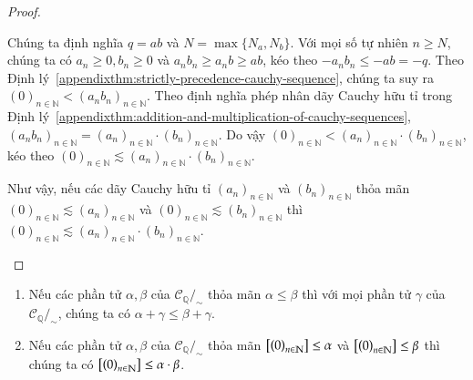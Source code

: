 \begin{proof}
\begin{enumerate}[label={(\roman*)}]
\begin{enumerate}[label={\textbf{Trường hợp \arabic*.}},itemindent=1cm]
                        Chúng ta định nghĩa $q = ab$ và $N = \max\{ N_{a}, N_{b} \}$. Với mọi số tự nhiên $n\geq N$, chúng ta có $a_{n}\geq 0, b_{n}\geq 0$ và $a_{n}b_{n}\geq a_{n}b \geq ab$, kéo theo $-a_{n}b_{n}\leq -ab = -q$. Theo Định lý~\ref{appendixthm:strictly-precedence-cauchy-sequence}, chúng ta suy ra ${(0)}_{n\in\mathbb{N}} < {(a_{n}b_{n})}_{n\in\mathbb{N}}$. Theo định nghĩa phép nhân dãy Cauchy hữu tỉ trong Định lý~\ref{appendixthm:addition-and-multiplication-of-cauchy-sequences}, ${(a_{n}b_{n})}_{n\in\mathbb{N}} = {(a_{n})}_{n\in\mathbb{N}}\cdot {(b_{n})}_{n\in\mathbb{N}}$. Do vậy ${(0)}_{n\in\mathbb{N}} < {(a_{n})}_{n\in\mathbb{N}}\cdot {(b_{n})}_{n\in\mathbb{N}}$, kéo theo ${(0)}_{n\in\mathbb{N}} \lesssim {(a_{n})}_{n\in\mathbb{N}}\cdot {(b_{n})}_{n\in\mathbb{N}}$.
              \end{enumerate}

              Như vậy, nếu các dãy Cauchy hữu tỉ ${(a_{n})}_{n\in\mathbb{N}}$ và ${(b_{n})}_{n\in\mathbb{N}}$ thỏa mãn ${(0)}_{n\in\mathbb{N}}\lesssim {(a_{n})}_{n\in\mathbb{N}}$ và ${(0)}_{n\in\mathbb{N}}\lesssim {(b_{n})}_{n\in\mathbb{N}}$ thì ${(0)}_{n\in\mathbb{N}}\lesssim {(a_{n})}_{n\in\mathbb{N}}\cdot {(b_{n})}_{n\in\mathbb{N}}$.
    \end{enumerate}
\end{proof}

\begin{appendixthm}
    \begin{enumerate}[label={(\roman*)}]
        \item Nếu các phần tử $\alpha, \beta$ của $\mathscr{C}_{\mathbb{Q}}/_{\sim}$ thỏa mãn $\alpha\leq \beta$ thì với mọi phần tử $\gamma$ của $\mathscr{C}_{\mathbb{Q}}/_{\sim}$, chúng ta có $\alpha + \gamma\leq \beta + \gamma$.
        \item Nếu các phần tử $\alpha, \beta$ của $\mathscr{C}_{\mathbb{Q}}/_{\sim}$ thỏa mãn $\left[{\left({0}\right)}_{{n}\in\mathbb{N}}\right] \leq \alpha$ và $\left[{\left({0}\right)}_{{n}\in\mathbb{N}}\right]\leq \beta$ thì chúng ta có $\left[{\left({0}\right)}_{{n}\in\mathbb{N}}\right]\leq \alpha\cdot\beta$.
    \end{enumerate}
\end{appendixthm}

